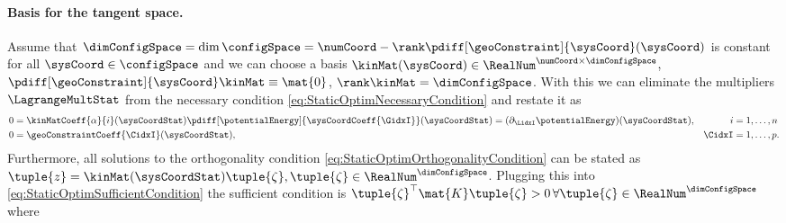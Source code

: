 \paragraph{Basis for the tangent space.}
Assume that $\dimConfigSpace = \dim\configSpace = \numCoord - \rank\pdiff[\geoConstraint]{\sysCoord}(\sysCoord)$ is constant for all $\sysCoord\in\configSpace$ and we can choose a basis $\kinMat(\sysCoord) \in \RealNum^{\numCoord\times\dimConfigSpace}$, $\pdiff[\geoConstraint]{\sysCoord}\kinMat \equiv \mat{0}$, $\rank\kinMat = \dimConfigSpace$. 
With this we can eliminate the multipliers $\LagrangeMultStat$ from the necessary condition \eqref{eq:StaticOptimNecessaryCondition} and restate it as
\begin{subequations}
\begin{align}
 0 &= \kinMatCoeff{\alpha}{i}(\sysCoordStat) \pdiff[\potentialEnergy]{\sysCoordCoeff{\GidxI}}(\sysCoordStat) = (\partial_\LidxI \potentialEnergy) (\sysCoordStat),&
 i &= 1,\ldots,n
\\
 0 &= \geoConstraintCoeff{\CidxI}(\sysCoordStat),&
 \CidxI &= 1,\ldots,p.
\end{align} 
\end{subequations}
Furthermore, all solutions to the orthogonality condition \eqref{eq:StaticOptimOrthogonalityCondition} can be stated as $\tuple{z} = \kinMat(\sysCoordStat) \tuple{\zeta}, \tuple{\zeta} \in \RealNum^{\dimConfigSpace}$.
Plugging this into \eqref{eq:StaticOptimSufficientCondition} the sufficient condition is $\tuple{\zeta}^\top \mat{K} \tuple{\zeta} > 0 \, \forall \tuple{\zeta} \in \RealNum^{\dimConfigSpace}$ where
